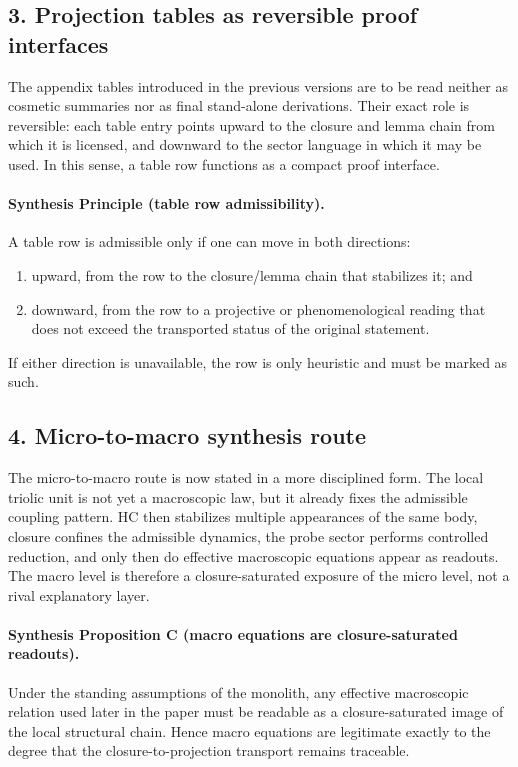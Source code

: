\subsection*{3. Projection tables as reversible proof interfaces}
The appendix tables introduced in the previous versions are to be read neither
as cosmetic summaries nor as final stand-alone derivations. Their exact role is
reversible: each table entry points upward to the closure and lemma chain from
which it is licensed, and downward to the sector language in which it may be
used. In this sense, a table row functions as a compact proof interface.

\paragraph{Synthesis Principle (table row admissibility).}
A table row is admissible only if one can move in both directions:
\begin{enumerate}[leftmargin=2em,label=(\alph*)]
  \item upward, from the row to the closure/lemma chain that stabilizes it; and
  \item downward, from the row to a projective or phenomenological reading that
  does not exceed the transported status of the original statement.
\end{enumerate}
If either direction is unavailable, the row is only heuristic and must be marked
as such.

\subsection*{4. Micro-to-macro synthesis route}
The micro-to-macro route is now stated in a more disciplined form. The local
triolic unit is not yet a macroscopic law, but it already fixes the admissible
coupling pattern. HC then stabilizes multiple appearances of the same body,
closure confines the admissible dynamics, the probe sector performs controlled
reduction, and only then do effective macroscopic equations appear as readouts.
The macro level is therefore a closure-saturated exposure of the micro level,
not a rival explanatory layer.

\paragraph{Synthesis Proposition C (macro equations are closure-saturated readouts).}
Under the standing assumptions of the monolith, any effective macroscopic
relation used later in the paper must be readable as a closure-saturated image
of the local structural chain. Hence macro equations are legitimate exactly to
the degree that the closure-to-projection transport remains traceable.

